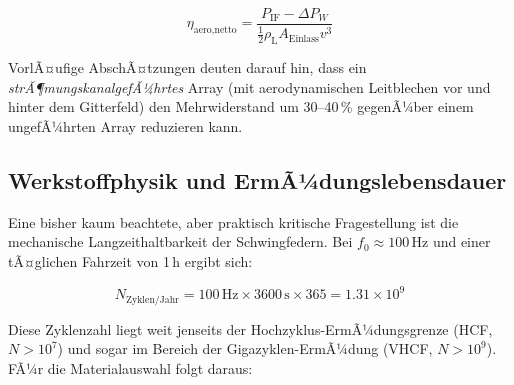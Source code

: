 ﻿\documentclass[12pt, a4paper]{report}
\theoremstyle{definition}
\theoremstyle{remark}
\newcommand{\rhoL}{\rho_{\text{L}}}
\newcommand{\Aeinlass}{A_{\text{Einlass}}}
\begin{document}
\begin{equation}
  \eta_{\text{aero,netto}} = \frac{P_{\text{IF}} - \Delta P_W}{\frac{1}{2}\rhoL \Aeinlass v^3}
  \label{eq:eta_aero_netto}
\end{equation}

VorlÃ¤ufige AbschÃ¤tzungen deuten darauf hin, dass ein \emph{strÃ¶mungskanal\-gefÃ¼hrtes}
Array (mit aerodynamischen Leitblechen vor und hinter dem Gitterfeld) den
Mehrwiderstand um 30--40\,\% gegenÃ¼ber einem ungefÃ¼hrten Array reduzieren kann.

\subsection{Werkstoffphysik und ErmÃ¼dungslebensdauer}
\label{ssec:ausblick_ermuedung}

Eine bisher kaum beachtete, aber praktisch kritische Fragestellung ist die
mechanische Langzeit\-haltbarkeit der Schwingfedern. Bei $f_0 \approx 100\,\text{Hz}$
und einer tÃ¤glichen Fahrzeit von 1\,h ergibt sich:

\begin{equation}
  N_{\text{Zyklen/Jahr}} = 100\,\text{Hz} \times 3600\,\text{s} \times 365 = 1.31 \times 10^9
  \label{eq:n_zyklen}
\end{equation}

Diese Zyklenzahl liegt weit jenseits der Hochzyklus-ErmÃ¼dungsgrenze (HCF,
$N > 10^7$) und sogar im Bereich der Gigazyklen-ErmÃ¼dung (VHCF,
$N > 10^9$). FÃ¼r die Materialauswahl folgt daraus:
\end{document}
